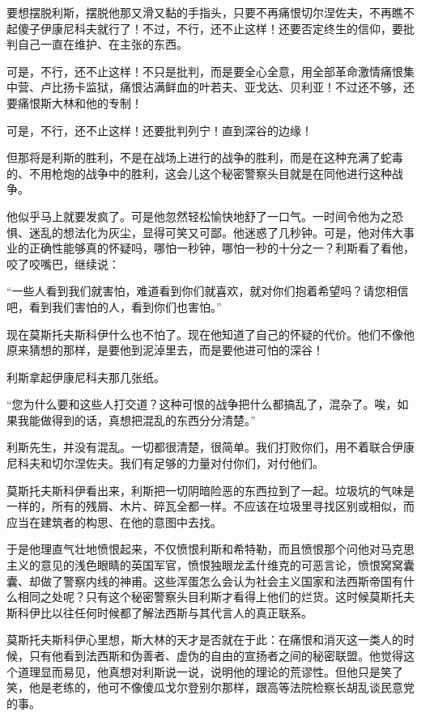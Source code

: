 要想摆脱利斯，摆脱他那又滑又黏的手指头，只要不再痛恨切尔涅佐夫，不再瞧不起傻子伊康尼科夫就行了！不过，不行，还不止这样！还要否定终生的信仰，要批判自己一直在维护、在主张的东西。

可是，不行，还不止这样！不只是批判，而是要全心全意，用全部革命激情痛恨集中营、卢比扬卡监狱，痛恨沾满鲜血的叶若夫、亚戈达、贝利亚！不过还不够，还要痛恨斯大林和他的专制！

可是，不行，还不止这样！还要批判列宁！直到深谷的边缘！

但那将是利斯的胜利，不是在战场上进行的战争的胜利，而是在这种充满了蛇毒的、不用枪炮的战争中的胜利，这会儿这个秘密警察头目就是在同他进行这种战争。

他似乎马上就要发疯了。可是他忽然轻松愉快地舒了一口气。一时间令他为之恐惧、迷乱的想法化为灰尘，显得可笑又可鄙。他迷惑了几秒钟。可是，他对伟大事业的正确性能够真的怀疑吗，哪怕一秒钟，哪怕一秒的十分之一？利斯看了看他，咬了咬嘴巴，继续说：

“一些人看到我们就害怕，难道看到你们就喜欢，就对你们抱着希望吗？请您相信吧，看到我们害怕的人，看到你们也害怕。”

现在莫斯托夫斯科伊什么也不怕了。现在他知道了自己的怀疑的代价。他们不像他原来猜想的那样，是要他到泥淖里去，而是要他进可怕的深谷！

利斯拿起伊康尼科夫那几张纸。

“您为什么要和这些人打交道？这种可恨的战争把什么都搞乱了，混杂了。唉，如果我能做得到的话，真想把混乱的东西分分清楚。”

利斯先生，并没有混乱。一切都很清楚，很简单。我们打败你们，用不着联合伊康尼科夫和切尔涅佐夫。我们有足够的力量对付你们，对付他们。

莫斯托夫斯科伊看出来，利斯把一切阴暗险恶的东西拉到了一起。垃圾坑的气味是一样的，所有的残屑、木片、碎瓦全都一样。不应该在垃圾里寻找区别或相似，而应当在建筑者的构思、在他的意图中去找。

于是他理直气壮地愤恨起来，不仅愤恨利斯和希特勒，而且愤恨那个问他对马克思主义的意见的浅色眼睛的英国军官，愤恨独眼龙孟什维克的可恶言论，愤恨窝窝囊囊、却做了警察内线的神甫。这些浑蛋怎么会认为社会主义国家和法西斯帝国有什么相同之处呢？只有这个秘密警察头目利斯才看得上他们的烂货。这时候莫斯托夫斯科伊比以往任何时候都了解法西斯与其代言人的真正联系。

莫斯托夫斯科伊心里想，斯大林的天才是否就在于此：在痛恨和消灭这一类人的时候，只有他看到法西斯和伪善者、虚伪的自由的宣扬者之间的秘密联盟。他觉得这个道理显而易见，他真想对利斯说一说，说明他的理论的荒谬性。但他只是笑了笑，他是老练的，他可不像傻瓜戈尔登别尔那样，跟高等法院检察长胡乱谈民意党的事。

